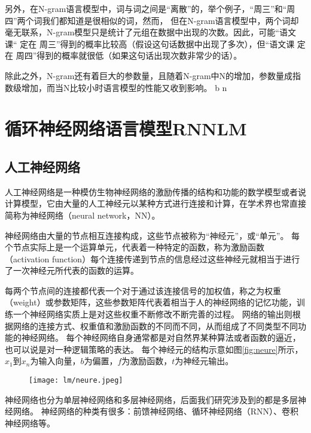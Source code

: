 另外，在N-gram语言模型中，词与词之间是“离散”的，举个例子，“周三”和“周四”两个词我们都知道是很相似的词，然而， 但在N-gram语言模型中，两个词却毫无联系，N-gram模型只是统计了元组在数据中出现的次数。因此，可能“语文课“ 定在 周三”得到的概率比较高（假设这句话数据中出现了多次），但“语文课 定在 周四”得到的概率就很低（如果这句话出现次数非常少的话）。

除此之外，N-gram还有着巨大的参数量，且随着N-gram中N的增加，参数量成指数级增加，而当N比较小时语言模型的性能又收到影响。 b n



\section{循环神经网络语言模型RNNLM}

\subsection{人工神经网络}
人工神经网络是一种模仿生物神经网络的激励传播的结构和功能的数学模型或者说计算模型，它由大量的人工神经元以某种方式进行连接和计算，在学术界也常直接简称为神经网络（neural network，NN）。

神经网络由大量的节点相互连接构成，这些节点被称为“神经元”，或“单元”。
每个节点实际上是一个运算单元，代表着一种特定的函数，称为激励函数（activation function）每个连接传递到节点的信息经过这些神经元就相当于进行了一次神经元所代表的函数的运算。

每两个节点间的连接都代表一个对于通过该连接信号的加权值，称之为权重（weight）或参数矩阵，这些参数矩阵代表着相当于人的神经网络的记忆功能，训练一个神经网络实质上是对这些权重不断修改不断完善的过程。
网络的输出则根据网络的连接方式、权重值和激励函数的不同而不同，从而组成了不同类型不同功能的神经网络。
每个神经网络自身通常都是对自然界某种算法或者函数的逼近，也可以说是对一种逻辑策略的表达。
每个神经元的结构示意如图\ref{fig:neure}所示，$x_1$到$x_n$为输入向量，$b$为偏置，$f$为激励函数，$t$为神经元输出。
\begin{figure}[!htbp]
  \centering
  \begin{minipage}[b]{0.6\textwidth}
    \captionstyle{\centering}
    \centering
    \texttt{[image: lm/neure.jpeg]}
  \end{minipage}     
\end{figure}
神经网络也分为单层神经网络和多层神经网络，后面我们研究涉及到的都是多层神经网络。
神经网络的种类有很多：前馈神经网络、循环神经网络（RNN）、卷积神经网络等。

